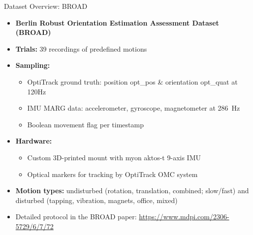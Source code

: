 \documentclass[aspectratio=169,xcolor=dvipsnames]{beamer}
\begin{document}
\begin{frame}{Dataset Overview: BROAD}
\begin{itemize}
  \item \textbf{Berlin Robust Orientation Estimation Assessment Dataset (BROAD)} \cite{BROAD}
  \item \textbf{Trials:} 39 recordings of predefined motions
  \item \textbf{Sampling:}
    \begin{itemize}
      \item OptiTrack ground truth: position {opt\_pos} \& orientation {opt\_quat} at 120Hz
      \item IMU MARG data: accelerometer, gyroscope, magnetometer at \SI{286}{Hz}
      \item Boolean movement flag per timestamp
    \end{itemize}
  \item \textbf{Hardware:}
    \begin{itemize}
      \item Custom 3D-printed mount with myon aktos-t 9-axis IMU
      \item Optical markers for tracking by OptiTrack OMC system
    \end{itemize}
  \item \textbf{Motion types:} undisturbed (rotation, translation, combined; slow/fast) and disturbed (tapping, vibration, magnets, office, mixed)
  \item Detailed protocol in the BROAD paper: \url{https://www.mdpi.com/2306-5729/6/7/72}
\end{itemize}
\end{frame}
\end{document}
